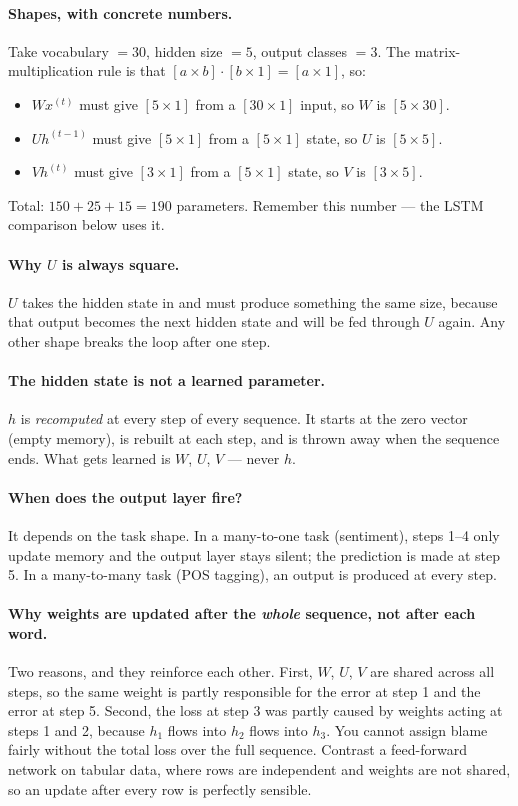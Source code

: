 \documentclass[11pt,a4paper]{article}
\begin{document}
\paragraph{Shapes, with concrete numbers.} Take vocabulary $=30$, hidden size $=5$, output
classes $=3$. The matrix-multiplication rule is that
$[a \times b] \cdot [b \times 1] = [a \times 1]$, so:
\begin{itemize}
\item $W x^{(t)}$ must give $[5\times1]$ from a $[30\times1]$ input, so $W$ is $[5 \times 30]$.
\item $U h^{(t-1)}$ must give $[5\times1]$ from a $[5\times1]$ state, so $U$ is $[5 \times 5]$.
\item $V h^{(t)}$ must give $[3\times1]$ from a $[5\times1]$ state, so $V$ is $[3 \times 5]$.
\end{itemize}
Total: $150 + 25 + 15 = 190$ parameters. Remember this number --- the LSTM comparison below
uses it.

\paragraph{Why $U$ is always square.} $U$ takes the hidden state in and must produce something
the same size, because that output becomes the next hidden state and will be fed through $U$
again. Any other shape breaks the loop after one step.

\paragraph{The hidden state is not a learned parameter.} $h$ is \emph{recomputed} at every
step of every sequence. It starts at the zero vector (empty memory), is rebuilt at each step,
and is thrown away when the sequence ends. What gets learned is $W$, $U$, $V$ --- never $h$.

\paragraph{When does the output layer fire?} It depends on the task shape. In a many-to-one
task (sentiment), steps 1--4 only update memory and the output layer stays silent; the
prediction is made at step 5. In a many-to-many task (POS tagging), an output is produced at
every step.

\paragraph{Why weights are updated after the \emph{whole} sequence, not after each word.}
Two reasons, and they reinforce each other. First, $W$, $U$, $V$ are shared across all steps,
so the same weight is partly responsible for the error at step 1 and the error at step 5.
Second, the loss at step 3 was partly caused by weights acting at steps 1 and 2, because
$h_1$ flows into $h_2$ flows into $h_3$. You cannot assign blame fairly without the total
loss over the full sequence. Contrast a feed-forward network on tabular data, where rows are
independent and weights are not shared, so an update after every row is perfectly sensible.
\end{document}
